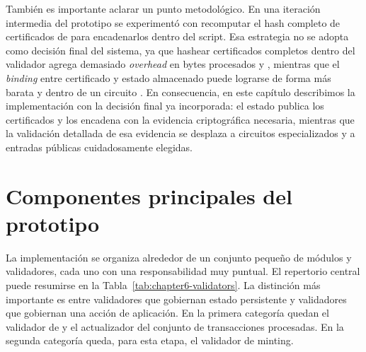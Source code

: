 También es importante aclarar un punto metodológico. En una iteración intermedia del prototipo se experimentó con recomputar \Onchain el hash completo de certificados de \Mithril para encadenarlos dentro del script. Esa estrategia no se adopta como decisión final del sistema, ya que hashear certificados completos dentro del validador agrega demasiado \textit{overhead} en bytes procesados y \ExUnits, mientras que el \textit{binding} entre certificado y estado almacenado \Onchain puede lograrse de forma más barata y dentro de un circuito \Offchain. En consecuencia, en este capítulo describimos la implementación con la decisión final ya incorporada: el estado \Onchain publica los certificados y los encadena con la evidencia criptográfica necesaria, mientras que la validación detallada de esa evidencia se desplaza a circuitos especializados y a entradas públicas cuidadosamente elegidas.

\section{Componentes principales del prototipo}
\label{sec:validadores-y-flujo-transaccional-componentes-principales-del-prototipo}

La implementación se organiza alrededor de un conjunto pequeño de módulos y validadores, cada uno con una responsabilidad muy puntual. El repertorio central puede resumirse en la Tabla~\ref{tab:chapter6-validators}. La distinción más importante es entre validadores que gobiernan estado persistente y validadores que gobiernan una acción de aplicación. En la primera categoría quedan el validador de \StakeDistribution y el actualizador del conjunto de transacciones procesadas. En la segunda categoría queda, para esta etapa, el validador de minting.

